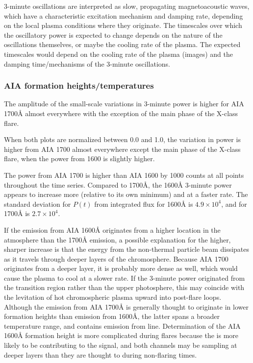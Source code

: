 3-minute oscillations are interpreted as slow, propagating magnetoacoustic waves,
which have a characteristic excitation mechanism and damping rate,
depending on the local plasma conditions where they originate.
The timescales over which the oscillatory power is expected to change
depends on the nature of the oscillations themselves,
or maybe the cooling rate of the plasma.
The expected timescales would depend on the cooling rate of the plasma
(images) and the damping time/mechanisms of the 3-minute oscillations.

\subsubsection{AIA formation heights/temperatures}

The amplitude of the small-scale variations in 3-minute
power is higher for AIA 1700\AA{} almost everywhere with
the exception of the main phase of the X-class flare.


When both plots are normalized between 0.0 and 1.0, the variation in
power is higher from AIA 1700 almost everywhere except the main phase of the
X-class flare, when the power from 1600 is slightly higher.

The power from AIA 1700 is higher than AIA 1600 by
1000 counts at all points throughout the time series.
Compared to 1700\AA{},
the 1600\AA{} 3-minute power appears to increase more
(relative to its own minimum) and at a faster rate.
The standard deviation for $P(t)$ from integrated flux
for 1600\AA{} is $4.9 \times 10^{4}$, and
for 1700\AA{} is $2.7 \times 10^{4}$.

If the emission from AIA 1600\AA{}
originates from a higher location in the atmosphere
than the 1700\AA{} emission,
a possible explanation for the higher, sharper increase
is that the energy from the non-thermal particle beam
dissipates as it travels through deeper layers of the chromosphere.
Because AIA 1700 originates from a deeper layer, it is probably more dense
as well, which would cause the plasma to cool at a slower rate.
If the 3-minute power originated from the transition region rather than the
upper photosphere, this may coincide with the levitation of hot chromospheric
plasma upward into post-flare loops.
Although the emission from AIA 1700\AA{} is generally thought to originate
in lower formation heights than emission from 1600\AA{},
the latter spans a broader temperature range, and contains
emission from  line.
Determination of the AIA 1600\AA{} formation height is more complicated
during flares because the  is more likely to be contributing
to the signal, and both channels may be sampling at deeper layers than
they are thought to during non-flaring times. 

